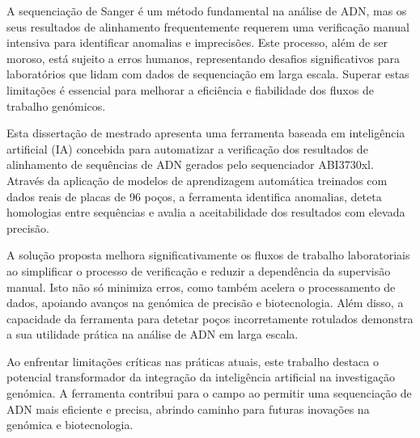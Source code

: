 
%

A sequenciação de Sanger é um método fundamental na análise de ADN, mas os seus resultados de alinhamento frequentemente requerem uma verificação manual intensiva para identificar anomalias e imprecisões. Este processo, além de ser moroso, está sujeito a erros humanos, representando desafios significativos para laboratórios que lidam com dados de sequenciação em larga escala. Superar estas limitações é essencial para melhorar a eficiência e fiabilidade dos fluxos de trabalho genómicos.

Esta dissertação de mestrado apresenta uma ferramenta baseada em inteligência artificial (IA) concebida para automatizar a verificação dos resultados de alinhamento de sequências de ADN gerados pelo sequenciador ABI3730xl. Através da aplicação de modelos de aprendizagem automática treinados com dados reais de placas de 96 poços, a ferramenta identifica anomalias, deteta homologias entre sequências e avalia a aceitabilidade dos resultados com elevada precisão.

A solução proposta melhora significativamente os fluxos de trabalho laboratoriais ao simplificar o processo de verificação e reduzir a dependência da supervisão manual. Isto não só minimiza erros, como também acelera o processamento de dados, apoiando avanços na genómica de precisão e biotecnologia. Além disso, a capacidade da ferramenta para detetar poços incorretamente rotulados demonstra a sua utilidade prática na análise de ADN em larga escala.

Ao enfrentar limitações críticas nas práticas atuais, este trabalho destaca o potencial transformador da integração da inteligência artificial na investigação genómica. A ferramenta contribui para o campo ao permitir uma sequenciação de ADN mais eficiente e precisa, abrindo caminho para futuras inovações na genómica e biotecnologia.

